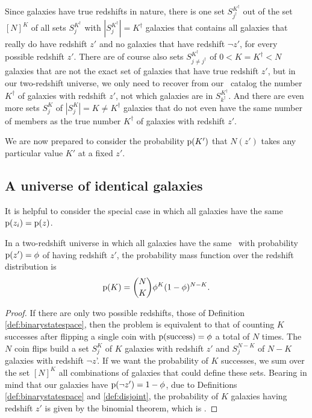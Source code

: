 Since galaxies have true redshifts in nature, there is one set $S^{K^{\dagger}}_{j^{\dagger}}$ out of the set $[N]^{K}$ of all sets $S^{K^{\dagger}}_{j}$ with $|S^{K^{\dagger}}_{j}| = K^{\dagger}$ galaxies that contains all galaxies that really do have redshift $z'$ and no galaxies that have redshift $\lnot z'$, for every possible redshift $z'$.
There are of course also sets $S^{K^{\dagger}}_{j \neq j^{\dagger}}$ of $0 < K = K^{\dagger} < N$ galaxies that are not the exact set of galaxies that have true redshift $z'$, but in our two-redshift universe, we only need to recover from our \pzpdf\ catalog the number $K^{\dagger}$ of galaxies with redshift $z'$, not which galaxies are in $S^{K^{\dagger}}_{k^{\dagger}}$. 
And there are even more sets $S^{K}_{j}$ of $|S^{K}_{j}| = K \neq K^{\dagger}$ galaxies that do not even have the same number of members as the true number $K^{\dagger}$ of galaxies with redshift $z'$.

We are now prepared to consider the probability $\mathrm{p}(K')$ that $N(z')$ takes any particular value $K'$ at a fixed $z'$.

\subsection{A universe of identical galaxies}

It is helpful to consider the special case in which all galaxies have the same \pzpdf\ $\mathrm{p}(z_{i}) = \mathrm{p}(z)$.

\begin{theorem}
	In a two-redshift universe in which all galaxies have the same \pzpdf\ with probability $\mathrm{p}(z') = \phi$ of having redshift $z'$, the probability mass function over the redshift distribution is
	\begin{equation}
	\eqlabel{eqn:binomial}
	\pr{K} = \binom{N}{K} \phi^{K} (1 - \phi)^{N - K} .
	\end{equation}
\end{theorem}
\begin{proof}
If there are only two possible redshifts, those of Definition \ref{def:binarystatespace}, then the problem is equivalent to that of counting $K$ successes after flipping a single coin with $\mathrm{p}(\mathrm{success}) = \phi$ a total of $N$ times.
The $N$ coin flips build a set $S^{K}_{j}$ of $K$ galaxies with redshift $z'$ and $S^{N-K}_{j}$ of $N - K$ galaxies with redshift $\lnot z$'.
If we want the probability of $K$ successes, we sum over the set $[N]^{K}$ all combinations of galaxies that could define these sets.
Bearing in mind that our galaxies have $\mathrm{p}(\lnot z') = 1 - \phi$, due to Definitions \ref{def:binarystatespace} and \ref{def:disjoint}, the probability of $K$ galaxies having redshift $z'$ is given by the binomial theorem, which is .
\end{proof}

